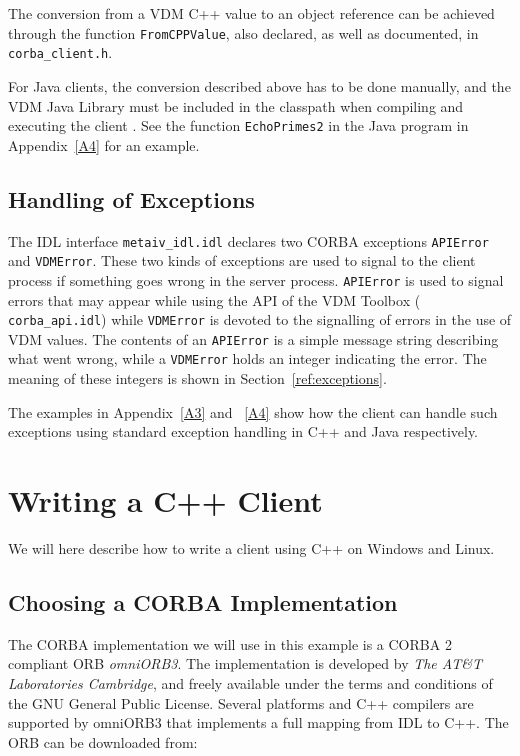 \documentclass[\pformat,12pt]{article}
\begin{document}
The conversion from a VDM C++ value to an object reference can be
achieved through the function {\tt FromCPPValue}, also declared, as
well as documented, in {\tt corba\_client.h}.  

For Java clients, the conversion described above has to be done
manually, and the VDM Java Library must be included in the classpath
when compiling and executing the client \cite{CGJavaManPP-SCSK}.
See the function \texttt{EchoPrimes2} in the Java program in
Appendix~\ref{A4} for an example.

\subsection{Handling of Exceptions}
\label{handlingofexceptions}

The IDL interface {\tt metaiv\_idl.idl}  declares two CORBA exceptions
{\tt APIError} and {\tt VDMError}. These two kinds 
of exceptions are used to signal to the client process if something
goes wrong in the server process. {\tt APIError} is used to signal errors
that may appear while using the API of the VDM Toolbox ({\tt
  corba\_api.idl}) while {\tt VDMError} is devoted to the signalling of
errors in the use of VDM values. The contents of an {\tt APIError} is a
simple message string describing what went wrong, while a {\tt VDMError}
holds an integer indicating the error. The meaning of these integers
is shown in Section~\ref{ref:exceptions}.

The examples in Appendix~\ref{A3} and ~\ref{A4} show how
the client can handle such exceptions using standard exception
handling in C++ and Java respectively.

\newpage
\section{Writing a C++ Client}
\label{writingacppclient}

We will here describe  how to write a client using C++ on Windows
and Linux.  

\subsection{Choosing a CORBA Implementation}

The CORBA implementation we will use in this example is a CORBA 2
compliant ORB {\em omniORB3}. The implementation is developed by {\em The
AT\&T Laboratories Cambridge}, and freely available under
the terms and conditions of the GNU General Public License. Several
platforms and C++ compilers are supported by omniORB3 that implements
a full mapping from IDL to C++.  The ORB can be downloaded from:
\end{document}
